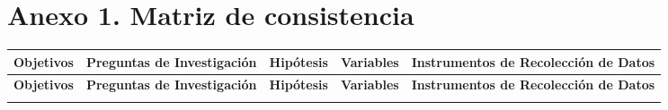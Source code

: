 
\chapter*{Anexo 1. Matriz de consistencia}


\begin{longtable}{|p{4cm}|p{4cm}|p{4cm}|p{4cm}|p{4cm}|}
\hline
\textbf{Objetivos} & \textbf{Preguntas de Investigación} & \textbf{Hipótesis} & \textbf{Variables} & \textbf{Instrumentos de Recolección de Datos} \\
\hline
\endfirsthead  %

\hline
\textbf{Objetivos} & \textbf{Preguntas de Investigación} & \textbf{Hipótesis} & \textbf{Variables} & \textbf{Instrumentos de Recolección de Datos} \\
\hline
\endhead  %

\hline
\endfoot  %

\hline
\endlastfoot  %


\end{longtable}

